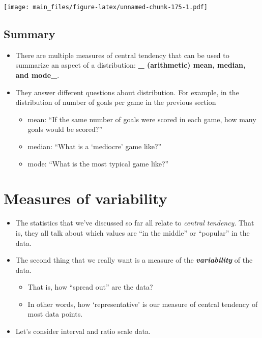 \documentclass[
]{book}
\providecommand{\tightlist}{%
  \setlength{\itemsep}{0pt}\setlength{\parskip}{0pt}}
\begin{document}
\texttt{[image: main\_files/figure-latex/unnamed-chunk-175-1.pdf]}

\hypertarget{summary}{%
\subsection{Summary}\label{summary}}

\begin{itemize}
\tightlist
\item
  There are multiple measures of central tendency that can be used to summarize an aspect of a distribution: \textbf{\_ (arithmetic) mean, median, and mode\_}.
\item
  They answer different questions about distribution. For example, in the distribution of number of goals per game in the previous section

  \begin{itemize}
  \tightlist
  \item
    mean: ``If the same number of goals were scored in each game, how many goals would be scored?''
  \item
    median: ``What is a `mediocre' game like?''
  \item
    mode: ``What is the most typical game like?''
  \end{itemize}
\end{itemize}

\hypertarget{var}{%
\section{Measures of variability}\label{var}}

\begin{itemize}
\tightlist
\item
  The statistics that we've discussed so far all relate to \emph{central tendency}. That is, they all talk about which values are ``in the middle'' or ``popular'' in the data.
\item
  The second thing that we really want is a measure of the \textbf{\emph{variability}} of the data.

  \begin{itemize}
  \tightlist
  \item
    That is, how ``spread out'' are the data?
  \item
    In other words, how `representative' is our measure of central tendency of most data points.
  \end{itemize}
\item
  Let's consider interval and ratio scale data.
\end{itemize}
\end{document}
